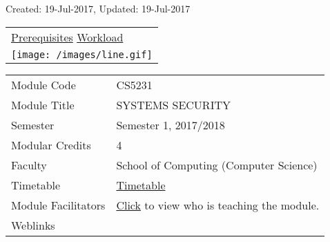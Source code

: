 \protect\hypertarget{ctl00_ctl00_ContentPlaceHolder1_ContentPlaceHolder1_LV_UpdateInfo_ctrl0_txtDate}{}{Created:
19-Jul-2017, Updated: 19-Jul-2017}

\begin{longtable}[]{@{}l@{}}
\toprule
\protect\hypertarget{ctl00_ctl00_ContentPlaceHolder1_ContentPlaceHolder1_lblSectionTop}{}{\protect\hyperlink{Prerequisites}{Prerequisites}
\textbar{} \protect\hyperlink{Workload}{Workload}}\tabularnewline
\texttt{[image: /images/line.gif]}\tabularnewline
\bottomrule
\end{longtable}

\hypertarget{ctl00_ctl00_ContentPlaceHolder1_ContentPlaceHolder1_LV_itemPlaceholderContainer}{}
\begin{longtable}[]{@{}ll@{}}
\toprule
\protect\hypertarget{ctl00_ctl00_ContentPlaceHolder1_ContentPlaceHolder1_LV_ctrl0_txtCode}{}{Module
Code} &
\protect\hypertarget{ctl00_ctl00_ContentPlaceHolder1_ContentPlaceHolder1_LV_ctrl0_lcCode}{}{CS5231}\tabularnewline
\protect\hypertarget{ctl00_ctl00_ContentPlaceHolder1_ContentPlaceHolder1_LV_ctrl0_lcCourse}{}{Module
Title} &
\protect\hypertarget{ctl00_ctl00_ContentPlaceHolder1_ContentPlaceHolder1_LV_ctrl0_lcCourseName}{}{SYSTEMS
SECURITY}\tabularnewline
\protect\hypertarget{ctl00_ctl00_ContentPlaceHolder1_ContentPlaceHolder1_LV_ctrl0_lcSemester}{}{Semester}
&
\protect\hypertarget{ctl00_ctl00_ContentPlaceHolder1_ContentPlaceHolder1_LV_ctrl0_lcSem}{}{Semester
1, 2017/2018}\tabularnewline
\protect\hypertarget{ctl00_ctl00_ContentPlaceHolder1_ContentPlaceHolder1_LV_ctrl0_lcModCredit}{}{Modular
Credits} &
\protect\hypertarget{ctl00_ctl00_ContentPlaceHolder1_ContentPlaceHolder1_LV_ctrl0_lcModC}{}{4}\tabularnewline
\protect\hypertarget{ctl00_ctl00_ContentPlaceHolder1_ContentPlaceHolder1_LV_ctrl0_lcFaculty}{}{Faculty}
&
\protect\hypertarget{ctl00_ctl00_ContentPlaceHolder1_ContentPlaceHolder1_LV_ctrl0_lcFac}{}{School
of Computing (Computer Science)}\tabularnewline
\protect\hypertarget{ctl00_ctl00_ContentPlaceHolder1_ContentPlaceHolder1_LV_ctrl0_Label1}{}{Timetable}
&
\protect\hypertarget{ctl00_ctl00_ContentPlaceHolder1_ContentPlaceHolder1_LV_ctrl0_Span1}{}{\href{javascript:void(0);}{Timetable}}\tabularnewline
\protect\hypertarget{ctl00_ctl00_ContentPlaceHolder1_ContentPlaceHolder1_LV_ctrl0_Label6}{}{Module
Facilitators} &
\protect\hypertarget{ctl00_ctl00_ContentPlaceHolder1_ContentPlaceHolder1_LV_ctrl0_Span2}{}{\href{list_lecturers.aspx?CourseID=5ce9cfc8-7723-4eb2-b778-d47665e247db\&ClickFrom=}{Click}
to view who is teaching the module.}\tabularnewline
\protect\hypertarget{ctl00_ctl00_ContentPlaceHolder1_ContentPlaceHolder1_LV_ctrl0_LabelCtrl1}{}{Weblinks}
&\tabularnewline
\bottomrule
\end{longtable}

